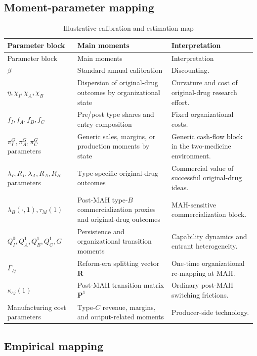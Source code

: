 \documentclass[12pt]{article}
\newcommand{\1}{\mathbf{1}}
\begin{document}
\subsection{Moment-parameter mapping}

\small
\setlength{\tabcolsep}{3pt}
\begin{longtable}{@{}P{0.27\textwidth}P{0.30\textwidth}P{0.35\textwidth}@{}}
\caption{Illustrative calibration and estimation map}\label{tab:calibration}\\
\toprule
Parameter block & Main moments & Interpretation \\
\midrule
\endfirsthead
\toprule
Parameter block & Main moments & Interpretation \\
\midrule
\endhead
$\beta$ & Standard annual calibration & Discounting. \\
$\eta,\chi_I,\chi_A,\chi_B$ & Dispersion of original-drug outcomes by organizational state & Curvature and cost of original-drug research effort. \\
$f_I,f_A,f_B,f_C$ & Pre/post type shares and entry composition & Fixed organizational costs. \\
$\pi_I^G,\pi_A^G,\pi_C^G$ parameters & Generic sales, margins, or production moments by state & Generic cash-flow block in the two-medicine environment. \\
$\lambda_I,R_I,\lambda_A,R_A,R_B$ parameters & Type-specific original-drug outcomes & Commercial value of successful original-drug ideas. \\
$\lambda_B(\cdot,1),\tau_M(1)$ & Post-MAH type-$B$ commercialization proxies and original-drug outcomes & MAH-sensitive commercialization block. \\
$Q_I^0,Q_A^1,Q_B^1,Q_C^1,G$ & Persistence and organizational transition moments & Capability dynamics and entrant heterogeneity. \\
$\Gamma_{Ij}$ & Reform-era splitting vector $\mathbf R$ & One-time organizational re-mapping at MAH. \\
$\kappa_{sj}(1)$ & Post-MAH transition matrix $\mathbf P^1$ & Ordinary post-MAH switching frictions. \\
Manufacturing cost parameters & Type-$C$ revenue, margins, and output-related moments & Producer-side technology. \\
\bottomrule
\end{longtable}

\subsection{Empirical mapping}
\end{document}
